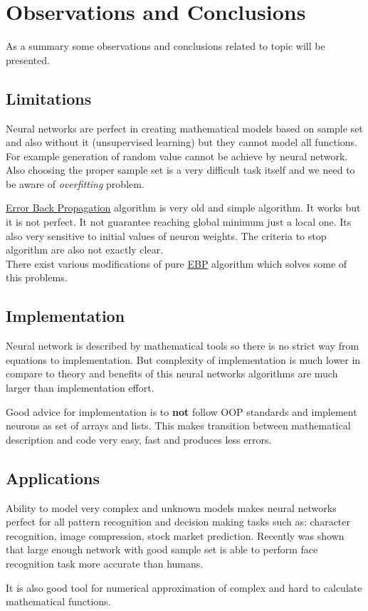 \section{Observations and Conclusions}
\label{ObservationsConclusions}

As a summary some observations and conclusions related to topic will be presented.

\subsection{Limitations}
\label{Limitations}

Neural networks are perfect in creating mathematical models based on sample set and also without it (unsupervised learning) but they cannot model all functions. For example generation of random value cannot be achieve by neural network. Also choosing the proper sample set is a very difficult task itself and we need to be aware of \textit{overfitting} problem.

\hyperref[sec:Training]{Error Back Propagation} algorithm is very old and simple algorithm. It works but it is not perfect. It not guarantee reaching global minimum just a local one. Its also very sensitive to initial values of neuron weights. The criteria to stop algorithm are also not exactly clear. \\
There exist various modifications of pure \hyperref[sec:Training]{EBP} algorithm which solves some of this problems.

\subsection{Implementation}
\label{Implementation}

Neural network is described by mathematical tools so there is no strict way from equations to implementation.
But complexity of implementation is much lower in compare to theory and benefits of this neural networks algorithms are much larger than implementation effort.

Good advice for implementation is to \textbf{not} follow OOP standards and implement neurons as set of arrays and lists. This makes transition between mathematical description and code very easy, fast and produces less errors.


\subsection{Applications}
\label{Applications}

Ability to model very complex and unknown models makes neural networks perfect for all pattern recognition and decision making tasks such as: character recognition, image compression, stock market prediction. Recently was shown that large enough network with good sample set is able to perform face recognition task more accurate than humans.

It is also good tool for numerical approximation of complex and hard to calculate mathematical functions.